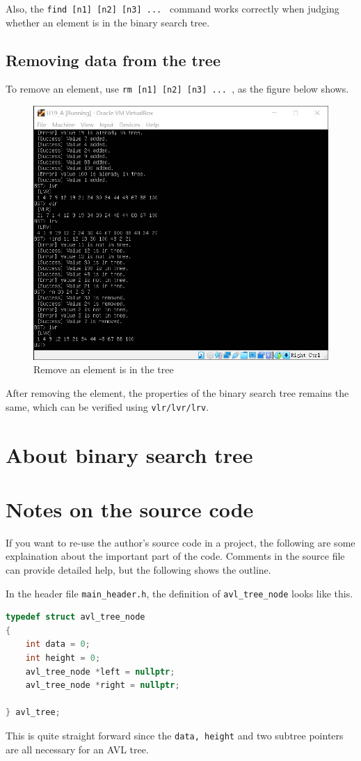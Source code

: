 \documentclass[cn,black,12pt,normal]{elegantnote}
\begin{document}
Also, the \lstinline{find [n1] [n2] [n3] ... } command works correctly when judging whether an element is in the binary search tree.


\subsection{Removing data from the tree}
To remove an element, use \lstinline{rm [n1] [n2] [n3] ... }, as the figure below shows.
\begin{figure}[H]
    \centering
    \includegraphics[width=0.7\linewidth]{image/avl_05.jpg}
    \caption{Remove an element is in the tree}
\end{figure}
After removing the element, the properties of the binary search tree remains the same, which can be verified using \lstinline{vlr/lvr/lrv}.

\section{About binary search tree}

\section{Notes on the source code}

If you want to re-use the author's source code in a project, the following are some explaination about the important part of the code. Comments in the source file can provide detailed help, but the following shows the outline.

In the header file \lstinline{main_header.h}, the definition of \lstinline{avl_tree_node} looks like this.
\begin{lstlisting}[language = C++]
typedef struct avl_tree_node
{
	int data = 0;
	int height = 0;
	avl_tree_node *left = nullptr;
	avl_tree_node *right = nullptr;

} avl_tree;
\end{lstlisting}
This is quite straight forward since the \lstinline{data, height} and two subtree pointers are all necessary for an AVL tree.
\end{document}
